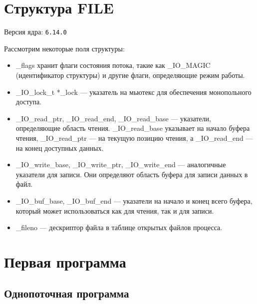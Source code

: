 \section{Структура FILE}

Версия ядра: \texttt{6.14.0}


\captionsetup{singlelinecheck = false, justification=raggedright}


\captionsetup{singlelinecheck = false, justification=raggedright}



Рассмотрим некоторые поля структуры:
\begin{itemize}
    \item \_flags хранит флаги состояния потока, такие как \_IO\_MAGIC (идентификатор структуры) и другие флаги, определяющие режим работы.
    \item \_IO\_lock\_t *\_lock --- указатель на мьютекс для обеспечения монопольного доступа.
    \item \_IO\_read\_ptr, \_IO\_read\_end, \_IO\_read\_base --- указатели, определяющие область чтения. \_IO\_read\_base указывает на начало буфера чтения, \newline \_IO\_read\_ptr --- на текущую позицию чтения, а \_IO\_read\_end --- на конец доступных данных.
    \item \_IO\_write\_base, \_IO\_write\_ptr, \_IO\_write\_end --- аналогичные указатели для записи. Они определяют область буфера для записи данных в файл.
    \item \_IO\_buf\_base, \_IO\_buf\_end --- указатели на начало и конец всего буфера, который может использоваться как для чтения, так и для записи.
    \item \_fileno --- дескриптор файла в таблице открытых файлов процесса.
\end{itemize}

\newpage

\section{Первая программа}

\subsection{Однопоточная программа}

\captionsetup{singlelinecheck = false, justification=raggedright}


